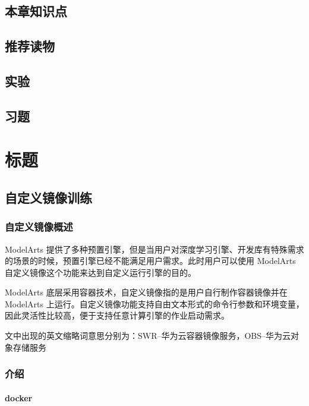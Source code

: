 \documentclass[fontset=windows,openany,UTF8]{ctexbook}
\begin{document}
\section{本章知识点}

\section{推荐读物}

\section*{实验\thechapter}

\section*{习题\thechapter}


\chapter{标题}

\section{自定义镜像训练}

\subsection{自定义镜像概述}

ModelArts 提供了多种预置引擎，但是当用户对深度学习引擎、开发库有特殊需求的场景的时候，预置引擎已经不能满足用户需求。此时用户可以使用 ModelArts 自定义镜像这个功能来达到自定义运行引擎的目的。

ModelArts 底层采用容器技术，自定义镜像指的是用户自行制作容器镜像并在 ModelArts 上运行。自定义镜像功能支持自由文本形式的命令行参数和环境变量，因此灵活性比较高，便于支持任意计算引擎的作业启动需求。

文中出现的英文缩略词意思分别为：SWR--华为云容器镜像服务，OBS--华为云对象存储服务

\subsection{介绍}

\subsubsection{docker}
\end{document}
